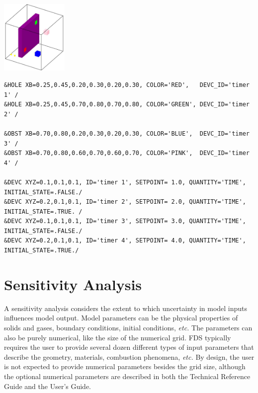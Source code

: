 \documentclass[11pt]{book}
\begin{document}
\vspace{0.2in}
\tiny
\noindent
\begin{minipage}{1.4in}
\includegraphics[height=1.4in]{FIGURES/create_remove}
\end{minipage}
\hfill
\begin{minipage}{5.5in}
\begin{verbatim}
&HOLE XB=0.25,0.45,0.20,0.30,0.20,0.30, COLOR='RED',   DEVC_ID='timer 1' /
&HOLE XB=0.25,0.45,0.70,0.80,0.70,0.80, COLOR='GREEN', DEVC_ID='timer 2' /

&OBST XB=0.70,0.80,0.20,0.30,0.20,0.30, COLOR='BLUE',  DEVC_ID='timer 3' /
&OBST XB=0.70,0.80,0.60,0.70,0.60,0.70, COLOR='PINK',  DEVC_ID='timer 4' /

&DEVC XYZ=0.1,0.1,0.1, ID='timer 1', SETPOINT= 1.0, QUANTITY='TIME', INITIAL_STATE=.FALSE./
&DEVC XYZ=0.2,0.1,0.1, ID='timer 2', SETPOINT= 2.0, QUANTITY='TIME', INITIAL_STATE=.TRUE. /
&DEVC XYZ=0.1,0.1,0.1, ID='timer 3', SETPOINT= 3.0, QUANTITY='TIME', INITIAL_STATE=.FALSE./
&DEVC XYZ=0.2,0.1,0.1, ID='timer 4', SETPOINT= 4.0, QUANTITY='TIME', INITIAL_STATE=.TRUE./
\end{verbatim}
\end{minipage}
\normalsize



\chapter{Sensitivity Analysis}

A sensitivity  analysis considers the  extent to which  uncertainty in
model  inputs influences  model output.  Model parameters  can  be the
physical properties of solids  and gases, boundary conditions, initial
conditions, {\em  etc.} The parameters  can also be  purely numerical,
like the size  of the numerical grid. FDS  typically requires the user
to  provide several  dozen different  types of  input  parameters that
describe the geometry, materials,  combustion phenomena, {\em etc.} By
design,  the user  is  not expected  to  provide numerical  parameters
besides the grid size,  although the optional numerical parameters are
described in both the Technical Reference Guide and the User's Guide.
\end{document}

